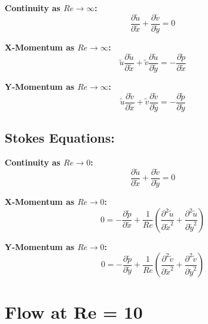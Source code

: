 \documentclass[11pt]{article}
\begin{document}
\vspace{5mm}

\textbf{Continuity as $Re \rightarrow \infty$:}
\begin{equation*}
\frac{\partial \tilde{u}}{\partial \tilde{x}} + \frac{\partial \tilde{v}}{\partial \tilde{y}} = 0
\end{equation*}

\vspace{2.5mm}

\textbf{X-Momentum as $Re \rightarrow \infty$:}
\[
\tilde{u} \frac{\partial \tilde{u}}{\partial \tilde{x}} + \tilde{v} \frac{\partial \tilde{u}}{\partial \tilde{y}} = -\frac{\partial \tilde{p}}{\partial \tilde{x}}
\]

\vspace{2.5mm}

\textbf{Y-Momentum as $Re \rightarrow \infty$:}
\[
\tilde{u} \frac{\partial \tilde{v}}{\partial \tilde{x}} + \tilde{v} \frac{\partial \tilde{v}}{\partial \tilde{y}} = -\frac{\partial \tilde{p}}{\partial \tilde{y}}
\]

\vspace{5mm}

\subsection*{Stokes Equations:}


\vspace{5mm}

\textbf{Continuity as $Re \rightarrow 0$:}
\[
\frac{\partial \tilde{u}}{\partial \tilde{x}} + \frac{\partial \tilde{v}}{\partial \tilde{y}} = 0
\]

\vspace{2.5mm}

\textbf{X-Momentum as $Re \rightarrow 0$:}
\[
0 = -\frac{\partial \tilde{p}}{\partial \tilde{x}} + \frac{1}{Re} \left( \frac{\partial^2 \tilde{u}}{\partial \tilde{x}^2} + \frac{\partial^2 \tilde{u}}{\partial \tilde{y}^2} \right)
\]

\vspace{2.5mm}

\textbf{Y-Momentum as $Re \rightarrow 0$:}
\[
0 = -\frac{\partial \tilde{p}}{\partial \tilde{y}} + \frac{1}{Re} \left( \frac{\partial^2 \tilde{v}}{\partial \tilde{x}^2} + \frac{\partial^2 \tilde{v}}{\partial \tilde{y}^2} \right)
\]


\pagebreak



\section{Flow at Re = 10}
\end{document}
